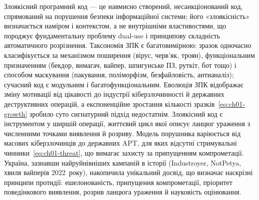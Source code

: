 Злоякісний програмний код --- це навмисно створений, несанкціонований код, спрямований на порушення безпеки інформаційної системи; його «злоякісність» визначається наміром і контекстом, а не внутрішніми властивостями, що породжує фундаментальну проблему dual-use і принципову складність автоматичного розрізнення. Таксономія ЗПК є багатовимірною: зразок одночасно класифікується за механізмом поширення (вірус, черв'як, троян), функціональним призначенням (бекдор, вимагач, вайпер, шпигунське ПЗ, руткіт, бот тощо) і способом маскування (пакування, поліморфізм, безфайловість, антианаліз); сучасний код є модульним і багатофункціональним. Еволюція ЗПК відображає зміну мотивації від цікавості до індустрії кіберзлочинності й державних деструктивних операцій, а експоненційне зростання кількості зразків~\eqref{eq:ch01-growth} зробило суто сигнатурний підхід недостатнім. Злоякісний код є інструментом у ширшій операції, життєвий цикл якої описує ланцюг ураження з численними точками виявлення й розриву. Модель порушника варіюється від масових кіберзлочинців до державних APT, для яких відсутні стримувальні чинники~\eqref{eq:ch01-threat}, що вимагає захисту за припущенням компрометації. Україна, зазнавши найруйнівніших кампаній в історії (Industroyer, NotPetya, хвиля вайперів 2022~року), накопичила унікальний досвід, що визначає наскрізні принципи протидії: ешелонованість, припущення компрометації, пріоритет поведінкового виявлення, розрив ланцюга ураження й науковість оцінювання.

